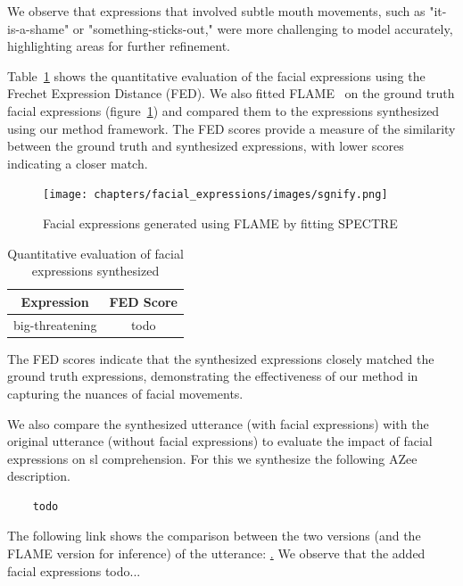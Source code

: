 \documentclass[../../main]{subfiles}
\begin{document}
We observe that expressions that involved subtle mouth movements, such as "it-is-a-shame" or "something-sticks-out," were more challenging to model accurately, highlighting areas for further refinement.

Table~\ref{tab:facial_expressions_quantitative} shows the quantitative evaluation of the facial expressions using the Frechet Expression Distance (FED). We also fitted FLAME~\cite{FLAME} on the ground truth facial expressions (figure~\ref{ch:facial_expressions:fig:spectre}) and compared them to the expressions synthesized using our method framework. The FED scores provide a measure of the similarity between the ground truth and synthesized expressions, with lower scores indicating a closer match.

\begin{figure}
    \centering
    \texttt{[image: chapters/facial\_expressions/images/sgnify.png]}
    \caption{Facial expressions generated using FLAME by fitting SPECTRE}
    \label{ch:facial_expressions:fig:spectre}
\end{figure}

\begin{table}
    \centering
    \begin{tabular}{|c|c|}
        \hline
        \textbf{Expression} & \textbf{FED Score} \\
        \hline
        big-threatening & todo \\
        \hline
    \end{tabular}
    \caption{Quantitative evaluation of facial expressions synthesized}
    \label{tab:facial_expressions_quantitative}
\end{table}

The FED scores indicate that the synthesized expressions closely matched the ground truth expressions, demonstrating the effectiveness of our method in capturing the nuances of facial movements.

We also compare the synthesized utterance (with facial expressions) with the original utterance (without facial expressions) to evaluate the impact of facial expressions on \gls{sl} comprehension. For this we synthesize the following AZee description.

\begin{verbatim}    
    todo
\end{verbatim}

The following link shows the comparison between the two versions (and the FLAME version for inference) of the utterance: \href{todo}. We observe that the added facial expressions todo...
\end{document}
